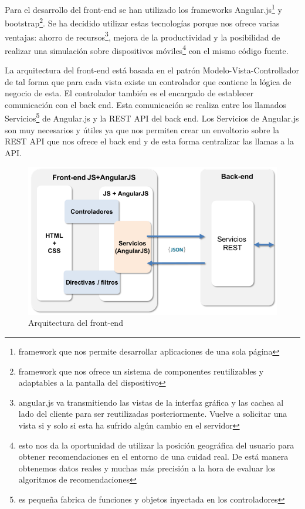 Para el desarrollo del front-end se han utilizado los frameworks Angular.js\footnote{framework que nos permite desarrollar aplicaciones de una sola página} y bootstrap\footnote{framework que nos ofrece un sistema de componentes reutilizables y adaptables a la pantalla del dispositivo}. Se ha decidido utilizar estas tecnologías porque nos ofrece varias ventajas: ahorro de recursos\footnote{angular.js va transmitiendo las vistas de la interfaz gráfica y las cachea al lado del cliente para ser reutilizadas posteriormente. Vuelve a solicitar una vista si y solo si esta ha sufrido algún cambio en el servidor}, mejora de la productividad y la posibilidad de realizar una simulación sobre dispositivos móviles\footnote{esto nos da la oportunidad de utilizar la posición geográfica del usuario para obtener recomendaciones en el entorno de una cuidad real. De está manera obtenemos datos reales y muchas más precisión a la hora de evaluar los algoritmos de recomendaciones} con el mismo código fuente.

La arquitectura del front-end está basada en el patrón Modelo-Vista-Controllador de tal forma que para cada vista existe un controlador que contiene la lógica de negocio de esta. El controlador también es el encargado de establecer comunicación con el back end. Esta comunicación se realiza entre los llamados Servicios\footnote{es pequeña fabrica de funciones y objetos inyectada en los controladores} de Angular.js y la REST API del back end. Los Servicios de Angular.js son muy necesarios y útiles ya que nos permiten crear un envoltorio sobre la REST API que nos ofrece el back end y de esta forma centralizar las llamas a la API.

\begin{figure}[H]
\centering\includegraphics[scale=0.7]{imagenes/arquitectura-front-end.png}
\caption{Arquitectura del front-end}
\label{arquitecturaFrontEnd}
\end{figure}

